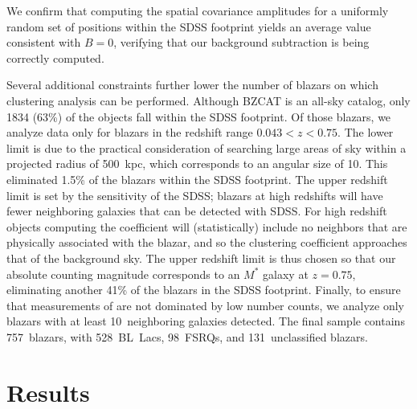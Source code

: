 \documentclass{emulateapj}
\begin{document}
We confirm that computing the spatial covariance amplitudes for a uniformly random set of positions within the SDSS footprint yields an average value consistent with $B=0$, verifying that our background subtraction is being correctly computed. 

Several additional constraints further lower the number of blazars on which clustering analysis can be performed. Although BZCAT is an all-sky catalog, only 1834 (63\%) of the objects fall within the SDSS footprint. Of those blazars, we analyze data only for blazars in the redshift range $0.043<z<0.75$. The lower limit is due to the practical consideration of searching large areas of sky within a projected radius of 500~kpc, which corresponds to an angular size of 10\arcmin. This eliminated 1.5\% of the blazars within the SDSS footprint. The upper redshift limit is set by the sensitivity of the SDSS; blazars at high redshifts will have fewer neighboring galaxies that can be detected with SDSS. For high redshift objects computing the \bgb{} coefficient will (statistically) include no neighbors that are physically associated with the blazar, and so the clustering coefficient approaches that of the background sky. The upper redshift limit is thus chosen so that our absolute counting magnitude corresponds to an $M^*$ galaxy at $z=0.75$, eliminating another 41\% of the blazars in the SDSS footprint. Finally, to ensure that measurements of \bgb{} are not dominated by low number counts, we analyze only blazars with at least 10~neighboring galaxies detected. The final sample contains 757~blazars, with 528~BL~Lacs, 98~FSRQs, and 131~unclassified blazars. 


\section{Results}\label{sec:survey_results}
\end{document}
